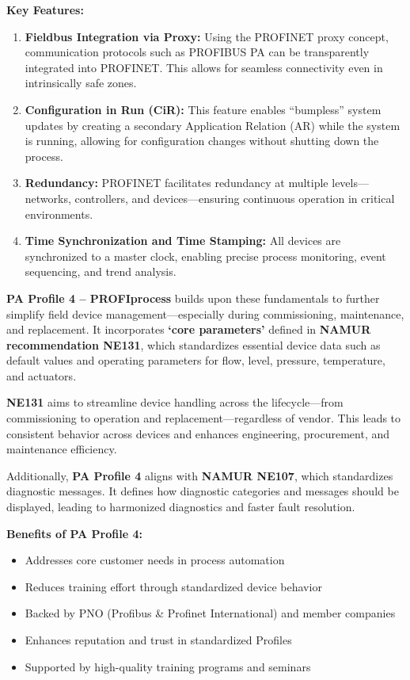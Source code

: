 \documentclass[conference]{IEEEtran}
\begin{document}
\textbf{Key Features:}
\begin{enumerate}
    \item \textbf{Fieldbus Integration via Proxy:} 
    Using the PROFINET proxy concept, communication protocols such as PROFIBUS PA can be transparently integrated into PROFINET. This allows for seamless connectivity even in intrinsically safe zones.

    \item \textbf{Configuration in Run (CiR):} 
    This feature enables “bumpless” system updates by creating a secondary Application Relation (AR) while the system is running, allowing for configuration changes without shutting down the process.

    \item \textbf{Redundancy:}
    PROFINET facilitates redundancy at multiple levels—networks, controllers, and devices—ensuring continuous operation in critical environments.

    \item \textbf{Time Synchronization and Time Stamping:}
    All devices are synchronized to a master clock, enabling precise process monitoring, event sequencing, and trend analysis.
\end{enumerate}

\textbf{PA Profile 4 – PROFIprocess} builds upon these fundamentals to further simplify field device management—especially during commissioning, maintenance, and replacement. It incorporates \textbf{‘core parameters’} defined in \textbf{NAMUR recommendation NE131}, which standardizes essential device data such as default values and operating parameters for flow, level, pressure, temperature, and actuators.

\textbf{NE131} aims to streamline device handling across the lifecycle—from commissioning to operation and replacement—regardless of vendor. This leads to consistent behavior across devices and enhances engineering, procurement, and maintenance efficiency.

Additionally, \textbf{PA Profile 4} aligns with \textbf{NAMUR NE107}, which standardizes diagnostic messages. It defines how diagnostic categories and messages should be displayed, leading to harmonized diagnostics and faster fault resolution.

\textbf{Benefits of PA Profile 4:}
\begin{itemize}
    \item Addresses core customer needs in process automation
    \item Reduces training effort through standardized device behavior
    \item Backed by PNO (Profibus \& Profinet International) and member companies
    \item Enhances reputation and trust in standardized Profiles
    \item Supported by high-quality training programs and seminars
\end{itemize}
\end{document}
